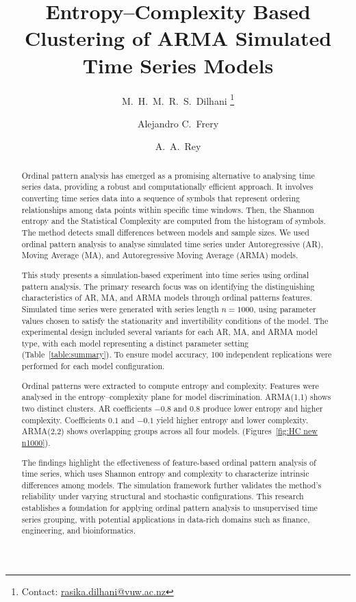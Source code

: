 \documentclass[11pt,a4paper]{article}
\title{\vspace{-1cm}Entropy–Complexity Based Clustering of ARMA Simulated Time Series Models\vspace{-0.3cm}}
\author[1]{M.\ H.\ M.\ R.\ S.\ Dilhani \thanks{Contact: \href{mailto:rasika.dilhani@vuw.ac.nz}{rasika.dilhani@vuw.ac.nz}}}
\author[1]{Alejandro C.\ Frery}
\author[2]{A.\ A.\ Rey}
\affil[1]{School of Mathematics and Statistics, Victoria University of Wellington, New Zealand}
\affil[2]{Laboratorio de Investigación y Desarrollo Experimental en Computación (LIDEC),\\
	Instituto de Tecnología e Ingeniería, Universidad Nacional de Hurlingham (UNAHUR), Argentina}
\date{}
\begin{document}
	\maketitle
	\vspace{-0.5cm}
	
	\begin{abstract}
		
				
Ordinal pattern analysis has emerged as a promising alternative to analysing time series data, providing a robust and computationally efficient approach. 
It involves converting time series data into a sequence of symbols that represent ordering relationships among data points within specific time windows.  
Then, the Shannon entropy and the Statistical Complexity are computed from the histogram of symbols. 
The method detects small differences between models and sample sizes.
We used ordinal pattern analysis to analyse simulated time series under Autoregressive (AR), Moving Average (MA), and Autoregressive Moving Average (ARMA) models. 
		
This study presents a simulation-based experiment into time series using ordinal pattern analysis. 
The primary research focus was on identifying the distinguishing characteristics of AR, MA, and ARMA models through ordinal patterns features. 
Simulated time series were generated with series length $n = 1000$, using parameter values chosen to satisfy the stationarity and invertibility conditions of the model. 
The experimental design included several variants for each AR, MA, and ARMA model type, with each model representing a distinct parameter setting (Table~\ref{table:summary}). 
To ensure model accuracy, 100 independent replications were performed for each model configuration.
		
Ordinal patterns were extracted to compute entropy and complexity. 
Features were analysed in the entropy–complexity plane for model discrimination. 
ARMA(1,1) shows two distinct clusters.
AR coefficients $-0.8$ and $0.8$ produce lower entropy and higher complexity. 
Coefficients $0.1$ and $-0.1$ yield higher entropy and lower complexity. 
ARMA(2,2) shows overlapping groups across all four models. (Figures~\ref{fig:HC new n1000}).
			
The findings highlight the effectiveness of feature-based ordinal pattern analysis of time series, which uses Shannon entropy and complexity to characterize intrinsic differences among models. 
The simulation framework further validates the method’s reliability under varying structural and stochastic configurations. 
This research establishes a foundation for applying ordinal pattern analysis to unsupervised time series grouping, with potential applications in data-rich domains such as finance, engineering, and bioinformatics.
		
	\end{abstract}
	
\end{document}
